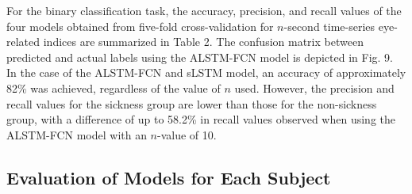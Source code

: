 \documentclass{ieeeaccess}
\begin{document}
For the binary classification task, the accuracy, precision, and recall values of the four models obtained from five-fold cross-validation for $n$-second time-series eye-related indices are summarized in Table 2. The confusion matrix between predicted and actual labels using the ALSTM-FCN model is depicted in Fig. 9. 
In the case of the ALSTM-FCN and sLSTM model, an accuracy of approximately 82\% was achieved, regardless of the value of $n$ used. 
However, the precision and recall values for the sickness group are lower than those for the non-sickness group, with a difference of up to 58.2\% in recall values observed when using the ALSTM-FCN model with an $n$-value of 10.

\subsection{Evaluation of Models for Each Subject}
\end{document}
